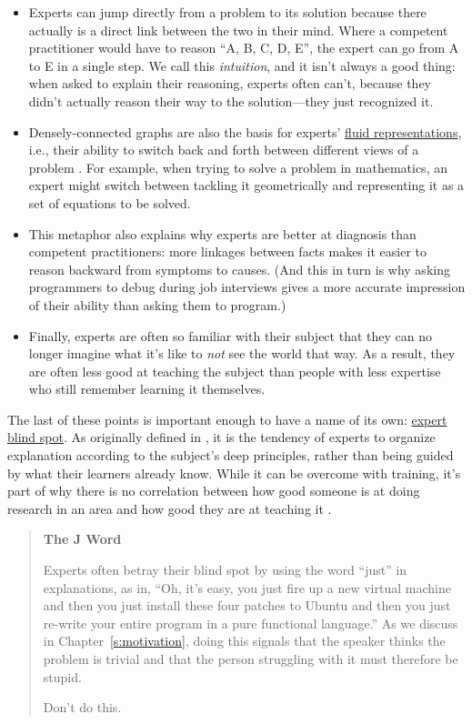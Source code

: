 \begin{itemize}
\item
  Experts can jump directly from a problem to its solution because
  there actually is a direct link between the two in their mind. Where
  a competent practitioner would have to reason ``A, B, C, D, E'', the
  expert can go from A to E in a single step. We call this
  \emph{intuition}, and it isn't always a good thing: when asked to explain
  their reasoning, experts often can't, because they didn't actually
  reason their way to the solution---they just recognized it.
\item
  Densely-connected graphs are also the basis for experts'
  \protect\hyperlink{g:fluid-representation}{fluid representations}, i.e.,
  their ability to switch back and forth between different views of a
  problem \cite{Petr2016}. For example, when trying to solve a
  problem in mathematics, an expert might switch between tackling it
  geometrically and representing it as a set of equations to be
  solved.
\item
  This metaphor also explains why experts are better at diagnosis than
  competent practitioners: more linkages between facts makes it easier
  to reason backward from symptoms to causes. (And this in turn is why
  asking programmers to debug during job interviews gives a more
  accurate impression of their ability than asking them to program.)
\item
  Finally, experts are often so familiar with their subject that they
  can no longer imagine what it's like to \emph{not} see the world that
  way. As a result, they are often less good at teaching the subject
  than people with less expertise who still remember learning it
  themselves.
\end{itemize}

The last of these points is important enough to have a name of its own:
\protect\hyperlink{g:expert-blind-spot}{expert blind spot}. As originally
defined in \cite{Nath2003}, it is the tendency of experts to organize
explanation according to the subject's deep principles, rather than
being guided by what their learners already know. While it can be
overcome with training, it's part of why there is no correlation between
how good someone is at doing research in an area and how good they are
at teaching it \cite{Mars2002}.

\begin{quote}\setlength{\parindent}{0pt}
\textbf{The J Word}

Experts often betray their blind spot by using the word ``just'' in
explanations, as in, ``Oh, it's easy, you just fire up a new virtual
machine and then you just install these four patches to Ubuntu and
then you just re-write your entire program in a pure functional
language.'' As we discuss in Chapter~\ref{s:motivation}, doing this
signals that the speaker thinks the problem is trivial and that the
person struggling with it must therefore be stupid.

Don't do this.
\end{quote}

